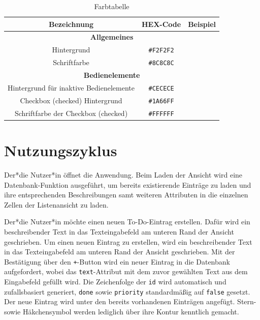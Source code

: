 \begin{table}[h!]
	\centering
	\begin{tabular}{ |c|c|c|}
		\hline
		\textbf{Bezeichnung} & \textbf{HEX-Code} & \textbf{Beispiel}\\
		\hline
		
		
		\hline
		\multicolumn{3}{|c|}{\textbf{Allgemeines}}\\
		\hline
		Hintergrund & \texttt{\#F2F2F2} &\cellcolor[HTML]{F2F2F2}\\
		\hline
		Schriftfarbe & \texttt{\#8C8C8C} &\cellcolor[HTML]{8C8C8C}\\
		\hline
		
		
		\hline
		\multicolumn{3}{|c|}{\textbf{Bedienelemente}}\\
		\hline
		Hintergrund für inaktive Bedienelemente & \texttt{\#CECECE} &\cellcolor[HTML]{CECECE}\\
		\hline
		Checkbox (checked) Hintergrund & \texttt{\#1A66FF} &\cellcolor[HTML]{1A66FF}\\
		\hline
		Schriftfarbe der Checkbox (checked) & \texttt{\#FFFFFF} &\cellcolor[HTML]{FFFFFF}\\
		\hline
	\end{tabular}
	\caption{Farbtabelle} \label{tab:farbtabelle}
\end{table}


\section{Nutzungszyklus}
Der*die Nutzer*in öffnet die Anwendung. Beim Laden der Ansicht wird eine Datenbank-Funktion ausgeführt, um bereits existierende Einträge zu laden und ihre entsprechenden Beschreibungen samt weiteren Attributen in die einzelnen Zellen der Listenansicht zu laden. 

Der*die Nutzer*in möchte einen neuen To-Do-Eintrag erstellen. Dafür wird ein beschreibender Text in das Texteingabefeld am unteren Rand der Ansicht geschrieben. Um einen neuen Eintrag zu erstellen, wird ein beschreibender Text in das Texteingabefeld am unteren Rand der Ansicht geschrieben. Mit der Bestätigung über den \texttt{+}-Button wird ein neuer Eintrag in die Datenbank aufgefordert, wobei das \texttt{text}-Attribut mit dem zuvor gewählten Text aus dem Eingabefeld gefüllt wird. Die Zeichenfolge der \texttt{id} wird automatisch und zufallsbasiert generiert, \texttt{done} sowie \texttt{priority} standardmäßig auf \texttt{false} gesetzt. Der neue Eintrag wird unter den bereits vorhandenen Einträgen angefügt. Stern- sowie Häkchensymbol werden lediglich über ihre Kontur kenntlich gemacht.


